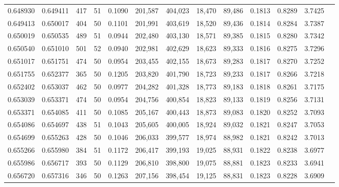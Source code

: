 \begin{tabular}{rrrrrrrrrrrrr}
0.648930 & 0.649411 &   417 &  51 &                                     0.1090 & 201,587 & 404,023 &  18,470 &  89,486 & 0.1813 & 0.8289 & 3.7425 \\
0.649413 & 0.650017 &   404 &  50 &                                     0.1101 & 201,991 & 403,619 &  18,520 &  89,436 & 0.1814 & 0.8284 & 3.7387 \\
0.650019 & 0.650535 &   489 &  51 &                                     0.0944 & 202,480 & 403,130 &  18,571 &  89,385 & 0.1815 & 0.8280 & 3.7342 \\
0.650540 & 0.651010 &   501 &  52 &                                     0.0940 & 202,981 & 402,629 &  18,623 &  89,333 & 0.1816 & 0.8275 & 3.7296 \\
0.651017 & 0.651751 &   474 &  50 &                                     0.0954 & 203,455 & 402,155 &  18,673 &  89,283 & 0.1817 & 0.8270 & 3.7252 \\
0.651755 & 0.652377 &   365 &  50 &                                     0.1205 & 203,820 & 401,790 &  18,723 &  89,233 & 0.1817 & 0.8266 & 3.7218 \\
0.652402 & 0.653037 &   462 &  50 &                                     0.0977 & 204,282 & 401,328 &  18,773 &  89,183 & 0.1818 & 0.8261 & 3.7175 \\
0.653039 & 0.653371 &   474 &  50 &                                     0.0954 & 204,756 & 400,854 &  18,823 &  89,133 & 0.1819 & 0.8256 & 3.7131 \\
0.653371 & 0.654085 &   411 &  50 &                                     0.1085 & 205,167 & 400,443 &  18,873 &  89,083 & 0.1820 & 0.8252 & 3.7093 \\
0.654086 & 0.654697 &   438 &  51 &                                     0.1043 & 205,605 & 400,005 &  18,924 &  89,032 & 0.1821 & 0.8247 & 3.7053 \\
0.654699 & 0.655263 &   428 &  50 &                                     0.1046 & 206,033 & 399,577 &  18,974 &  88,982 & 0.1821 & 0.8242 & 3.7013 \\
0.655266 & 0.655980 &   384 &  51 &                                     0.1172 & 206,417 & 399,193 &  19,025 &  88,931 & 0.1822 & 0.8238 & 3.6977 \\
0.655986 & 0.656717 &   393 &  50 &                                     0.1129 & 206,810 & 398,800 &  19,075 &  88,881 & 0.1823 & 0.8233 & 3.6941 \\
0.656720 & 0.657316 &   346 &  50 &                                     0.1263 & 207,156 & 398,454 &  19,125 &  88,831 & 0.1823 & 0.8228 & 3.6909 \\

\end{tabular}
